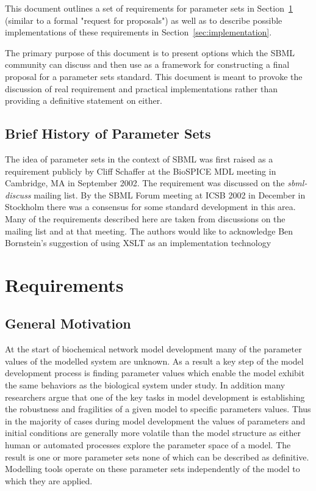 \documentclass[10pt,twocolumntoc]{cekarticle}
\begin{document}
This document outlines a set of requirements for parameter sets in
Section~\ref{sec:requirements}
(similar to a formal "request for proposals") as well as to describe possible implementations
of these requirements in Section~\ref{sec:implementation}.  

The primary purpose
of this document is to present options which the SBML community can discuss and then use
as a framework for constructing a final proposal for a parameter sets standard.  This
document is meant to provoke the discussion of real requirement and practical
implementations rather than providing a definitive statement on either.

\subsection{Brief History of Parameter Sets}

The idea of parameter sets in the context of SBML was first raised as a requirement
publicly by Cliff Schaffer at the BioSPICE MDL meeting in Cambridge, MA in September
2002.  The requirement was discussed on the \emph{sbml-discuss} mailing list.  By
the SBML Forum meeting at ICSB 2002 in December in Stockholm there was a consensus
for some standard development in this area.  Many of the requirements described here
are taken from discussions on the mailing list and at that meeting.  The authors
would like to acknowledge Ben Bornstein's suggestion of using XSLT as an
implementation technology

\section{Requirements}
\label{sec:requirements}

\subsection{General Motivation}
\label{sec:motivation}

At the start of biochemical network model development many of the parameter values of the 
modelled system are unknown.
As a result a key step of the model development process is finding parameter values which enable 
the model exhibit the same behaviors as the biological system under study. In addition many
researchers argue that one of the key tasks in model development is establishing the robustness 
and fragilities of a given model to specific parameters values. Thus in the majority of cases
during model development the values of parameters and initial conditions are generally more
volatile than the model structure as either human or automated processes explore the parameter 
space of a model.  The result is one or more parameter sets none of which can be described as
definitive.  Modelling tools operate on these parameter sets independently of the model to
which they are applied.
\end{document}
